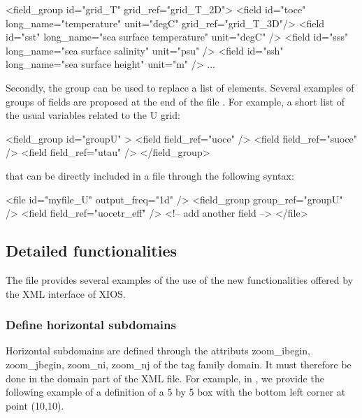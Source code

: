 \documentclass[../tex_main/NEMO_manual]{subfiles}
\begin{document}
\begin{xmllines}
<field_group id="grid_T" grid_ref="grid_T_2D">
	<field id="toce" long_name="temperature"             unit="degC" grid_ref="grid_T_3D"/>
	<field id="sst"  long_name="sea surface temperature" unit="degC"                     />
	<field id="sss"  long_name="sea surface salinity"    unit="psu"                      />
	<field id="ssh"  long_name="sea surface height"      unit="m"                        />
	...
\end{xmllines}

Secondly, the group can be used to replace a list of elements.
Several examples of groups of fields are proposed at the end of the file .
For example, a short list of the usual variables related to the U grid:

\begin{xmllines}
<field_group id="groupU" >
	<field field_ref="uoce"  />
	<field field_ref="suoce" />
	<field field_ref="utau"  />
</field_group>
\end{xmllines}

that can be directly included in a file through the following syntax:

\begin{xmllines}
<file id="myfile_U" output_freq="1d" />
	<field_group group_ref="groupU" />
	<field field_ref="uocetr_eff"   />  <!-- add another field -->
</file>   
\end{xmllines}

\subsection{Detailed functionalities}

The file  provides several examples of the use of 
the new functionalities offered by the XML interface of XIOS.

\subsubsection{Define horizontal subdomains}

Horizontal subdomains are defined through the attributs zoom\_ibegin, zoom\_jbegin, zoom\_ni, zoom\_nj of 
the tag family domain.
It must therefore be done in the domain part of the XML file. 
For example, in , we provide the following example of a definition of 
a 5 by 5 box with the bottom left corner at point (10,10).
\end{document}
